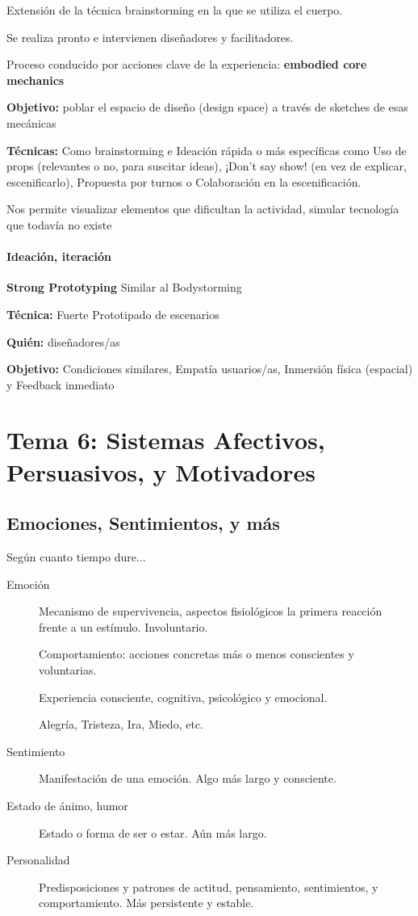 \documentclass[12pt, twoside, openright]{report} %
\begin{document}
Extensión de la técnica brainstorming en la que se utiliza el cuerpo.

Se realiza pronto e intervienen diseñadores y facilitadores.

Proceso conducido por acciones clave de la experiencia: \textbf{embodied core mechanics}

\textbf{Objetivo:} poblar el espacio de diseño (design space) a través de sketches de esas mecánicas

\textbf{Técnicas:} Como brainstorming e Ideación rápida o más específicas como Uso de props (relevantes o no, para suscitar ideas), ¡Don’t say show! (en vez de explicar, escenificarlo), Propuesta por turnos o Colaboración en la escenificación.

Nos permite visualizar elementos que dificultan la actividad, simular tecnología que todavía no existe

\subsubsection{Ideación, iteración}
\textbf{Strong Prototyping} Similar al Bodystorming

\textbf{Técnica:} Fuerte Prototipado de escenarios

\textbf{Quién:} diseñadores/as

\textbf{Objetivo:} Condiciones similares, Empatía usuarios/as, Inmersión física (espacial) y Feedback inmediato


\chapter{Tema 6: Sistemas Afectivos, Persuasivos, y Motivadores}

\section{Emociones, Sentimientos, y más}
Según cuanto tiempo dure...
\begin{description}
	\item[Emoción] Mecanismo de supervivencia, aspectos fisiológicos la primera reacción frente a un estímulo. Involuntario.

	      Comportamiento: acciones concretas más o menos conscientes y voluntarias.

	      Experiencia consciente, cognitiva, psicológico y emocional.

	      Alegría, Tristeza, Ira, Miedo, etc.
	\item[Sentimiento] Manifestación de una emoción. Algo más largo y consciente.
	\item[Estado de ánimo, humor] Estado o forma de ser o estar. Aún más largo.
	\item[Personalidad] Predisposiciones y patrones de actitud, pensamiento, sentimientos, y comportamiento. Más persistente y estable.
\end{description}
\end{document}
